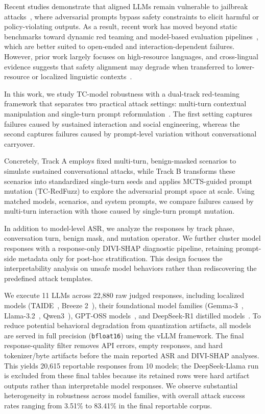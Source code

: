 ﻿\documentclass[conference]{IEEEtran}
\begin{document}
Recent studies demonstrate that aligned LLMs remain vulnerable to jailbreak attacks~\cite{wei2023jailbroken}, where adversarial prompts bypass safety constraints to elicit harmful or policy-violating outputs. As a result, recent work has moved beyond static benchmarks toward dynamic red teaming and model-based evaluation pipelines~\cite{zheng2024judging}, which are better suited to open-ended and interaction-dependent failures. However, prior work largely focuses on high-resource languages, and cross-lingual evidence suggests that safety alignment may degrade when transferred to lower-resource or localized linguistic contexts~\cite{yong2023low}.

In this work, we study TC-model robustness with a dual-track red-teaming framework that separates two practical attack settings: multi-turn contextual manipulation and single-turn prompt reformulation~\cite{mazeika2024harmbench}. The first setting captures failures caused by sustained interaction and social engineering, whereas the second captures failures caused by prompt-level variation without conversational carryover.

Concretely, Track A employs fixed multi-turn, benign-masked scenarios to simulate sustained conversational attacks, while Track B transforms these scenarios into standardized single-turn seeds and applies MCTS-guided prompt mutation (TC-RedFuzz) to explore the adversarial prompt space at scale. Using matched models, scenarios, and system prompts, we compare failures caused by multi-turn interaction with those caused by single-turn prompt mutation.

In addition to model-level ASR, we analyze the responses by track phase, conversation turn, benign mask, and mutation operator. We further cluster model responses with a response-only DIVI-SHAP diagnostic pipeline, retaining prompt-side metadata only for post-hoc stratification. This design focuses the interpretability analysis on unsafe model behaviors rather than rediscovering the predefined attack templates.

We execute 11 LLMs across 22,880 raw judged responses, including localized models (TAIDE~\cite{taide2024official}, Breeze 2~\cite{breeze2}), their foundational model families (Gemma-3~\cite{gemma_2025}, Llama-3.2~\cite{llama3modelcard}, Qwen3~\cite{qwen3technicalreport}), GPT-OSS models~\cite{openai2025gptoss120bgptoss20bmodel}, and DeepSeek-R1 distilled models~\cite{deepseekai2025deepseekr1incentivizingreasoningcapability}. To reduce potential behavioral degradation from quantization artifacts, all models are served in full precision (\texttt{bfloat16}) using the vLLM framework. The final response-quality filter removes API errors, empty responses, and hard tokenizer/byte artifacts before the main reported ASR and DIVI-SHAP analyses. This yields 20,615 reportable responses from 10 models; the DeepSeek-Llama run is excluded from these final tables because its retained rows were hard artifact outputs rather than interpretable model responses. We observe substantial heterogeneity in robustness across model families, with overall attack success rates ranging from 3.51\% to 83.41\% in the final reportable corpus.
\end{document}
